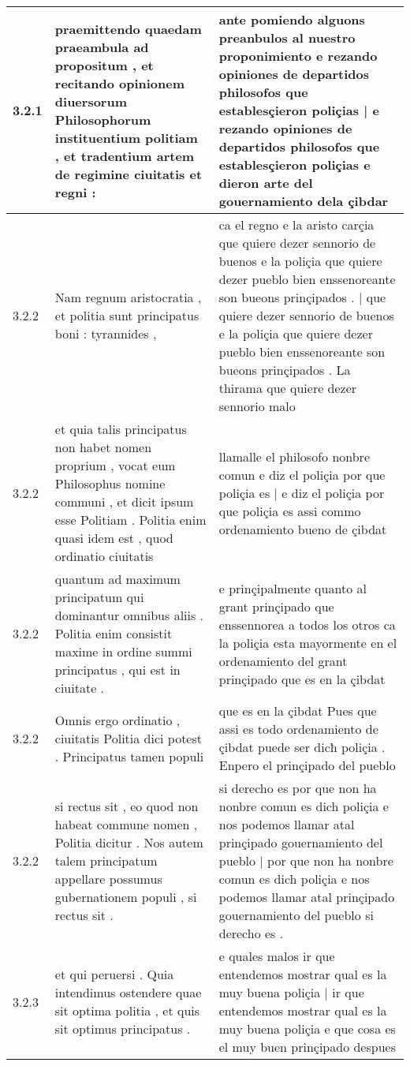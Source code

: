 \begin{tabular}{|p{1cm}|p{6.5cm}|p{6.5cm}|}

\hline
3.2.1 & praemittendo quaedam praeambula ad propositum , et recitando opinionem diuersorum Philosophorum instituentium politiam , et tradentium artem de regimine ciuitatis et regni : & ante pomiendo alguons preanbulos al nuestro proponimiento e rezando opiniones de departidos philosofos que establesçieron poliçias | e rezando opiniones de departidos philosofos que establesçieron poliçias e dieron arte del gouernamiento dela çibdar \\\hline
3.2.2 & Nam regnum aristocratia , et politia sunt principatus boni : tyrannides , & ca el regno e la aristo carçia que quiere dezer sennorio de buenos e la poliçia que quiere dezer pueblo bien enssenoreante son bueons prinçipados . | que quiere dezer sennorio de buenos e la poliçia que quiere dezer pueblo bien enssenoreante son bueons prinçipados . La thirama que quiere dezer sennorio malo \\\hline
3.2.2 & et quia talis principatus non habet nomen proprium , vocat eum Philosophus nomine communi , et dicit ipsum esse Politiam . Politia enim quasi idem est , quod ordinatio ciuitatis & llamalle el philosofo nonbre comun e diz el poliçia por que poliçia es | e diz el poliçia por que poliçia es assi commo ordenamiento bueno de çibdat \\\hline
3.2.2 & quantum ad maximum principatum qui dominantur omnibus aliis . Politia enim consistit maxime in ordine summi principatus , qui est in ciuitate . & e prinçipalmente quanto al grant prinçipado que enssennorea a todos los otros ca la poliçia esta mayormente en el ordenamiento del grant prinçipado que es en la çibdat \\\hline
3.2.2 & Omnis ergo ordinatio , ciuitatis Politia dici potest . Principatus tamen populi & que es en la çibdat Pues que assi es todo ordenamiento de çibdat puede ser dicħ poliçia . Enpero el prinçipado del pueblo \\\hline
3.2.2 & si rectus sit , eo quod non habeat commune nomen , Politia dicitur . Nos autem talem principatum appellare possumus gubernationem populi , si rectus sit . & si derecho es por que non ha nonbre comun es dich poliçia e nos podemos llamar atal prinçipado gouernamiento del pueblo | por que non ha nonbre comun es dich poliçia e nos podemos llamar atal prinçipado gouernamiento del pueblo si derecho es . \\\hline
3.2.3 & et qui peruersi . Quia intendimus ostendere quae sit optima politia , et quis sit optimus principatus . & e quales malos ir que entendemos mostrar qual es la muy buena poliçia | ir que entendemos mostrar qual es la muy buena poliçia e que cosa es el muy buen prinçipado despues \\\hline

\end{tabular}
